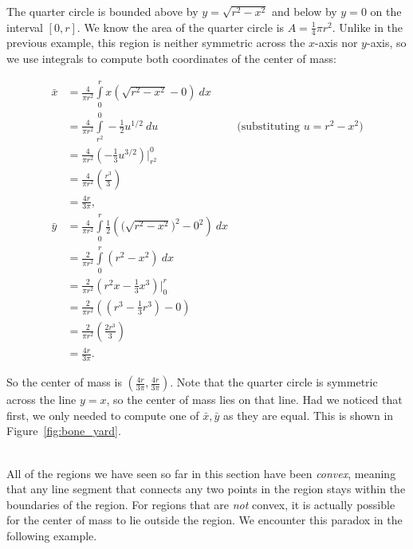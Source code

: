 {The quarter circle is bounded above by $y=\sqrt{r^2-x^2}$ and below by $y=0$ on the interval $[0,r]$.
We know the area of the quarter circle is $A=\frac14 \pi r^2$.
Unlike in the previous example, this region is neither symmetric across the $x$-axis nor $y$-axis, so we use integrals to compute both coordinates of the center of mass:

\begin{align*}
\bar{x} &= \frac{4}{\pi r^2} \int \limits_0^r x\left( \sqrt{r^2-x^2} - 0 \right) \ dx\\
&= \frac{4}{\pi r^2} \int\limits_{r^2}^0 -\frac12 u^{1/2}\ du &\Big(\text{substituting $u=r^2-x^2$}\Big)\\
&= \frac{4}{\pi r^2} \left(-\frac13 u^{3/2} \right)\Big|_{r^2}^0\\
&= \frac{4}{\pi r^2} \left( \frac{r^3}{3} \right)\\
&= \frac{4r}{3\pi},\\
\bar{y} &= \frac{4}{\pi r^2} \int \limits_0^r \frac{1}{2} \left( \Big(\sqrt{r^2-x^2}\Big)^2 - 0^2 \right) \ dx\\
&= \frac{2}{\pi r^2} \int \limits_0^r \left(r^2-x^2\right)\ dx\\
&= \frac{2}{\pi r^2} \left(r^2 x - \frac{1}{3}x^3\right)\Big|_0^r\\
&= \frac{2}{\pi r^2} \left( \left(r^3-\frac{1}{3}r^3\right) - 0 \right)\\
&= \frac{2}{\pi r^2} \left( \frac{2r^3}{3} \right)\\
&= \frac{4r}{3\pi}.
\end{align*}

So the center of mass is $\left( \frac{4r}{3\pi}, \frac{4r}{3\pi} \right)$.  Note that the quarter circle is symmetric across the line $y=x$, so the center of mass lies on that line.  Had we noticed that first, we only needed to compute one of $\bar{x},\bar{y}$ as they are equal.  This is shown in Figure~\ref{fig:bone_yard}.
}\\

All of the regions we have seen so far in this section have been {\it convex}, meaning that any line segment that connects any two points in the region stays within the boundaries of the region.  For regions that are {\it not} convex, it is actually possible for the center of mass to lie outside the region.  We encounter this paradox in the following example.\\

